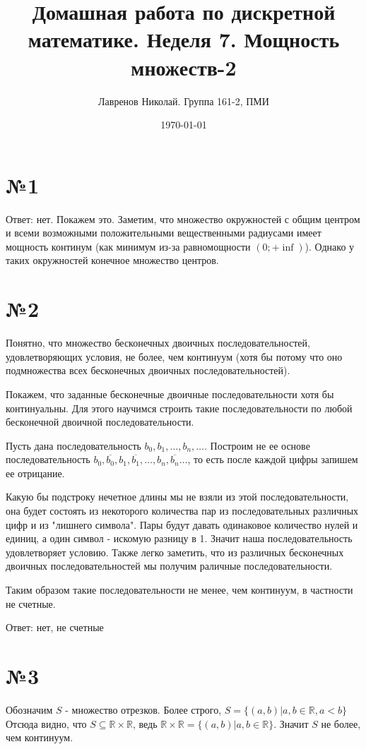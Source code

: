 \documentclass[12pt]{article}
\title{Домашная работа по дискретной математике. Неделя 7. Мощность множеств-2}
\date{\today}
\author{Лавренов Николай. Группа 161-2, ПМИ}
\newcommand{\real}{\mathbb{R}}
\begin{document}
	\maketitle
	\newpage 
	\section*{№1}
	Ответ: нет.
	Покажем это. Заметим, что множество окружностей с общим центром и всеми возможными положительными вещественными радиусами имеет мощность континум (как минимум из-за равномощности $(0; +\inf)$). Однако у таких окружностей конечное множество центров.
	\section*{№2}
	Понятно, что множество бесконечных двоичных последовательностей, удовлетворяющих условия, не более, чем континуум (хотя бы потому что оно подмножества всех бесконечных двоичных последовательностей).
	
	Покажем, что заданные бесконечные двоичные последовательности хотя бы континуальны. Для этого научимся строить такие последовательности по любой бесконечной двоичной последовательности.
	
	Пусть дана последовательность $ b_0, b_1, \dots, b_n, \dots $. 
	Построим не ее основе последовательность 	
	$b_0, \overline{b_0}, b_1, \overline{b_1}, \dots, b_n, \overline{b_n} \dots $,
	то есть после каждой цифры запишем ее отрицание.
	
	Какую бы подстроку нечетное длины мы не взяли из этой последовательности, она будет состоять из некоторого количества пар из последовательных различных цифр и из "лишнего символа". Пары будут давать одинаковое количество нулей и единиц, а один символ - искомую разницу в 1. Значит наша последовательность удовлетворяет условию.
	Также легко заметить, что из различных бесконечных двоичных последовательностей мы получим раличные последовательности.
	
	Таким образом такие последовательности не менее, чем континуум, в частности не счетные.
	
	Ответ: нет, не счетные
	\section*{№3}
	Обозначим $S$ - множество отрезков. Более строго, $S = \{(a, b) | a, b \in \real, a < b\}$
	Отсюда видно, что $S \subseteq \real \times \real$, ведь 
	$\real \times \real = \{(a, b) | a, b \in \real\}$. Значит $S$ не более, чем континуум.
	
\end{document}
